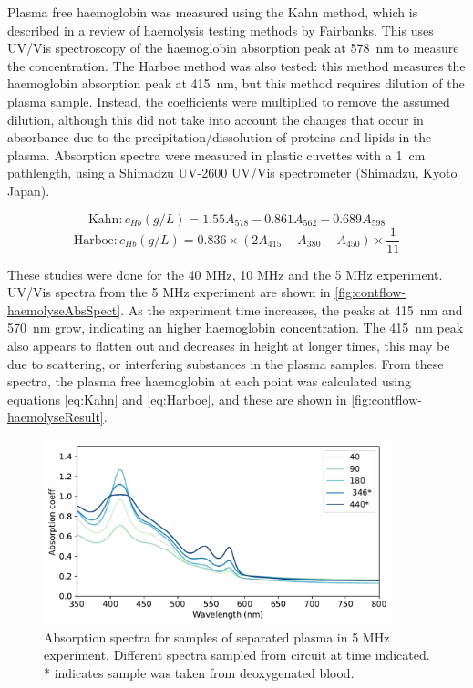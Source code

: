 Plasma free haemoglobin was measured using the Kahn method, which is described in a review of haemolysis testing methods by Fairbanks\cite{FairbanksMethodsmeasuringplasma1992}.
This uses UV/Vis spectroscopy of the haemoglobin absorption peak at \SI{578}{nm} to measure the concentration.
The Harboe method was also tested: this method measures the haemoglobin absorption peak at \SI{415}{nm}, but this method requires dilution of the plasma sample.
Instead, the coefficients were multiplied to remove the assumed dilution, although this did not take into account the changes that occur in absorbance due to the precipitation/dissolution of proteins and lipids in the plasma.
Absorption spectra were measured in plastic cuvettes with a \SI{1}{cm} pathlength, using a Shimadzu UV-2600 UV/Vis spectrometer (Shimadzu, Kyoto Japan).

\begin{equation}
\mathrm{Kahn: } c_{Hb} (\si{g/L}) = 1.55A_{578} - 0.861A_{562} - 0.689A_{598}
\label{eq:Kahn}
\end{equation}
\begin{equation}
\mathrm{Harboe: } c_{Hb} (\si{g/L}) = 0.836 \times \left( 2A_{415} - A_{380} - A_{450}\right) \times \frac{1}{11}
\label{eq:Harboe}
\end{equation}

These studies were done for the 40 MHz, 10 MHz and the 5 MHz experiment.
UV/Vis spectra from the 5 MHz experiment are shown in \autoref{fig:contflow-haemolyseAbsSpect}.
As the experiment time increases, the peaks at \SI{415}{nm} and \SI{570}{nm} grow, indicating an higher haemoglobin concentration.
The \SI{415}{nm} peak also appears to flatten out and decreases in height at longer times, this may be due to scattering, or interfering substances in the plasma samples.
From these spectra, the plasma free haemoglobin at each point was calculated using equations \ref{eq:Kahn} and \ref{eq:Harboe}, and these are shown in \autoref{fig:contflow-haemolyseResult}.

\begin{figure}[t]
\centering
\includegraphics[width=0.9\textwidth]{figures/contflow/haemolyseAbsSpect.pdf}
\caption[Absorption spectra for samples of separated plasma in 5 MHz experiment]{Absorption spectra for samples of separated plasma in 5 MHz experiment. Different spectra sampled from circuit at time indicated. * indicates sample was taken from deoxygenated blood.}
\label{fig:contflow-haemolyseAbsSpect}
\end{figure}

